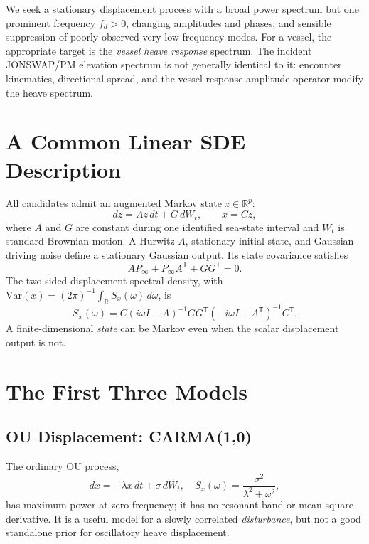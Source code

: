 \documentclass[10pt,journal]{IEEEtran}
\newcommand{\R}{\mathbb R}
\newcommand{\T}{^{\mathsf T}}
\newcommand{\PSD}{S_x}
\begin{document}
We seek a stationary displacement process with a broad power spectrum but
one prominent frequency \(f_d>0\), changing amplitudes and phases, and
sensible suppression of poorly observed very-low-frequency modes.
For a vessel, the appropriate target is the \emph{vessel heave response}
spectrum. The incident JONSWAP/PM elevation spectrum is not generally identical
to it: encounter kinematics, directional spread, and the vessel response
amplitude operator modify the heave spectrum.

\section{A Common Linear SDE Description}
All candidates admit an augmented Markov state \(z\in\R^p\):
\begin{equation}
dz=A z\,dt+G\,dW_t,\qquad x=Cz,
\label{eq:linear-sde}
\end{equation}
where \(A\) and \(G\) are constant during one identified sea-state interval
and \(W_t\) is standard Brownian motion. A Hurwitz \(A\), stationary initial
state, and Gaussian driving noise define a stationary Gaussian output.
Its state covariance satisfies
\begin{equation}
A P_\infty+P_\infty A\T+GG\T=0.
\label{eq:lyapunov}
\end{equation}
The two-sided displacement spectral density, with
\(\mathrm{Var}(x)=(2\pi)^{-1}\int_{\R}\PSD(\omega)\,d\omega\), is
\begin{equation}
\PSD(\omega)=
C(i\omega I-A)^{-1}GG\T
(-i\omega I-A\T)^{-1}C\T.
\label{eq:state-psd}
\end{equation}
A finite-dimensional \emph{state} can be Markov even when the scalar
displacement output is not.

\section{The First Three Models}
\subsection{OU Displacement: CARMA(1,0)}
The ordinary OU process,
\begin{equation}
dx=-\lambda x\,dt+\sigma\,dW_t,\quad
\PSD(\omega)=\frac{\sigma^2}{\lambda^2+\omega^2},
\label{eq:ou}
\end{equation}
has maximum power at zero frequency; it has no resonant band or
mean-square derivative. It is a useful model for a slowly correlated
\emph{disturbance}, but not a good standalone prior for oscillatory
heave displacement.
\end{document}
